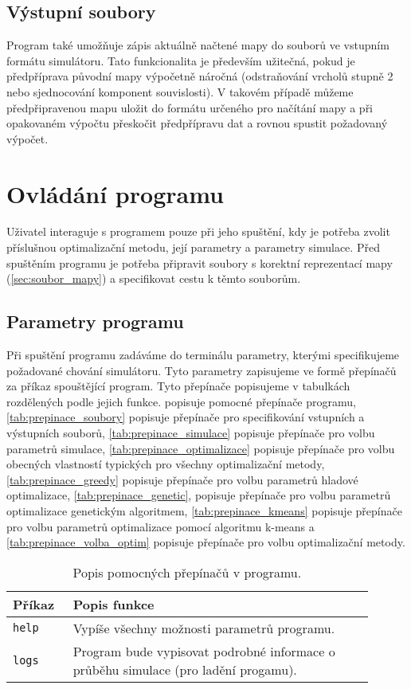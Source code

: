 \subsection{Výstupní soubory}

Program také umožňuje zápis aktuálně načtené mapy do souborů ve vstupním formátu
simulátoru. Tato funkcionalita je především užitečná, pokud je předpříprava
původní mapy výpočetně náročná (odstraňování vrcholů stupně 2 nebo 
sjednocování komponent souvislosti). V takovém případě můžeme předpřipravenou
mapu uložit do formátu určeného pro načítání mapy a při opakovaném výpočtu
přeskočit předpřípravu dat a rovnou spustit požadovaný výpočet.


\section{Ovládání programu}

Uživatel interaguje s programem pouze při jeho spuštění, kdy je potřeba
zvolit příslušnou optimalizační metodu, její parametry a parametry simulace.
Před spuštěním programu je potřeba připravit soubory s korektní 
reprezentací mapy (\cref{sec:soubor_mapy}) a specifikovat 
cestu k těmto souborům.


\subsection{Parametry programu}
\label{subsec:parametry_programu}
Při spuštění programu zadáváme do terminálu parametry, kterými specifikujeme
požadované chování simulátoru. Tyto parametry zapisujeme ve formě přepínačů za
příkaz spouštějící program. Tyto přepínače popisujeme v tabulkách rozdělených
podle jejich funkce.
 popisuje pomocné přepínače programu, 
\cref{tab:prepinace_soubory} popisuje přepínače pro specifikování vstupních a 
výstupních souborů, \cref{tab:prepinace_simulace} popisuje přepínače pro volbu
parametrů simulace, \cref{tab:prepinace_optimalizace} popisuje přepínače pro 
volbu obecných vlastností typických pro všechny optimalizační metody,
\cref{tab:prepinace_greedy} popisuje přepínače pro volbu parametrů hladové optimalizace,
\cref{tab:prepinace_genetic}, popisuje přepínače pro volbu parametrů optimalizace genetickým
algoritmem, \cref{tab:prepinace_kmeans} popisuje přepínače pro volbu parametrů optimalizace
pomocí algoritmu k-means a \cref{tab:prepinace_volba_optim} popisuje přepínače pro volbu
optimalizační metody.

\begin{table}
\centering\footnotesize\sf
\begin{tabular}{p{0.15\linewidth} p{0.75\linewidth}}
\toprule
Příkaz & Popis funkce \\
\midrule
\texttt{help} & Vypíše všechny možnosti parametrů programu. \\
\texttt{logs} & Program bude vypisovat podrobné informace o průběhu simulace 
(pro ladění progamu). \\
\bottomrule
\end{tabular}
\caption{Popis pomocných přepínačů v programu.}
\label{tab:prepinace_pomocne}
\end{table}


